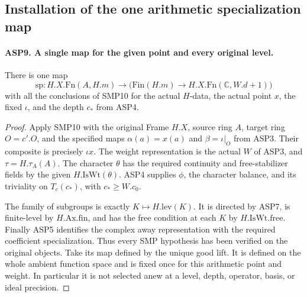 \documentclass[11pt,a4paper]{article}
\numberwithin{equation}{section}
\theoremstyle{remark}\newtheorem{remark}[theorem]{Remark}
\begin{document}
\subsection{Installation of the one arithmetic specialization map}

\paragraph{ASP9. A single map for the given point and every original level.}
\label{claim:ASP9}
There is one map
\begin{equation}\label{eq:asp-map}
 \mathrm{sp}:H.X.\mathrm{Fn}(A,\allowbreak{} H.m)\longrightarrow
              \bigl(\mathrm{Fin}(H.m)\to
                              H.X.\mathrm{Fn}(\mathbb C,\allowbreak{} W.d+1)\bigr)
\end{equation}
with all the conclusions of SMP10 for the actual
$H$-data, the actual point $x$, the fixed $\iota$,
and the depth $c_*$ from ASP4.
\begin{proof}
Apply SMP10 with the original Frame $H.X$,
source ring $A$, target ring $O=c'.O$, and the
specified maps
$\alpha(a)=x(a)$ and $\beta=\iota|_O$ from ASP3.
Their composite is precisely $\iota x$.
The weight representation is the actual $W$
of ASP3, and $\tau=H.\tau_A(A)$.
The character $\theta$ has the required
continuity and free-stabilizer fields by the
given $H.\mathrm{IsWt}(\theta)$.
ASP4 supplies $\phi$, the character balance,
and its triviality on $T_c(c_*)$, with
$c_*\geq W.c_0$.

The family of subgroups is exactly
$K\mapsto H.\mathrm{lev}(K)$.  It is directed
by ASP7, is finite-level by $H.\mathrm{Ax}.\mathrm{fin}$,
and has the free condition at each $K$ by
$H.\mathrm{IsWt}.\mathrm{free}$.
Finally ASP5 identifies the complex away
representation with the required coefficient
specialization.  Thus every SMP hypothesis
has been verified on the original objects.
Take its map defined by the unique good lift.
It is defined on the whole ambient function
space and is fixed once for this arithmetic
point and weight.  In particular it is not
selected anew at a level, depth, operator,
basis, or ideal precision.
\end{proof}

\end{document}
